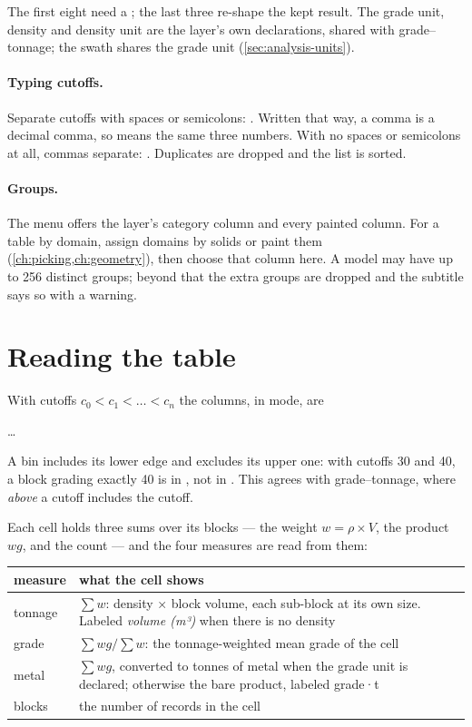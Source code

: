 The first eight need a ; the last three re-shape the kept result. The grade unit, density and density unit are the layer's own declarations, shared with grade–tonnage; the swath shares the grade unit (\cref{sec:analysis-units}).

\paragraph{Typing cutoffs.} Separate cutoffs with spaces or semicolons: . Written that way, a comma is a decimal comma, so  means the same three numbers. With no spaces or semicolons at all, commas separate: . Duplicates are dropped and the list is sorted.

\paragraph{Groups.} The  menu offers the layer's category column and every painted column. For a table by domain, assign domains by solids or paint them (\cref{ch:picking,ch:geometry}), then choose that column here. A model may have up to 256 distinct groups; beyond that the extra groups are dropped and the subtitle says so with a warning.

\section{Reading the table}\label{sec:xtab-reading}
With cutoffs $c_0 < c_1 < \dots < c_n$ the columns, in  mode, are

\begin{center}
 \quad {} \quad … \quad {} \quad {} \quad {}
\end{center}

A bin includes its lower edge and excludes its upper one: with cutoffs 30 and 40, a block grading exactly 40 is in , not in . This agrees with grade–tonnage, where \emph{above} a cutoff includes the cutoff.

Each cell holds three sums over its blocks — the weight $w = \rho \times V$, the product $w g$, and the count — and the four measures are read from them:

\medskip
\begin{tabularx}{\linewidth}{@{}lL@{}}\toprule
measure & what the cell shows \\ \midrule
tonnage & $\sum w$: density × block volume, each sub-block at its own size. Labeled \emph{volume (m³)} when there is no density \\
grade & $\sum w g / \sum w$: the tonnage-weighted mean grade of the cell \\
metal & $\sum w g$, converted to tonnes of metal when the grade unit is declared; otherwise the bare product, labeled grade·t \\
blocks & the number of records in the cell \\ \bottomrule
\end{tabularx}
\medskip

